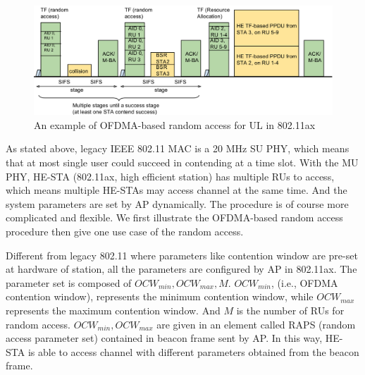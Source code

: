 

\begin{figure}[!t]
\centering
\includegraphics[scale=0.35]{./figure/chp2/RA_illu_2.png}
\caption{An example of OFDMA-based random access for UL in 802.11ax}
\label{fig_ra_ul}
\end{figure}

As stated above, legacy IEEE 802.11 MAC is a 20 MHz SU PHY, which means that at most single user could succeed in contending at a time slot.
With the MU PHY, HE-STA (802.11ax, high efficient station) has multiple RUs to access, which means multiple HE-STAs may access channel at the same time.
And the system parameters are set by AP dynamically.
The procedure is of course more complicated and flexible.
We first illustrate the OFDMA-based random access procedure then give one use case of the random access.

Different from legacy 802.11 where parameters like contention window are pre-set at hardware of station, all the parameters are configured by AP in 802.11ax. 
The parameter set is composed of $OCW_{min}, OCW_{max}, M$. $OCW_{min}$, (i.e., OFDMA contention window), represents the minimum contention window, while $OCW_{max}$ represents the maximum contention window. 
And $M$ is the number of RUs for random access. $OCW_{min}, OCW_{max}$ are given in an element called RAPS (random access parameter set) contained in beacon frame sent by AP.
In this way, HE-STA is able to access channel with different parameters obtained from the beacon frame. 


